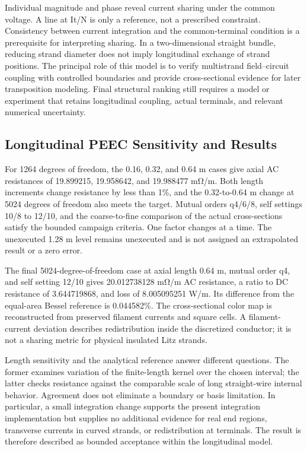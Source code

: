 \documentclass[11pt]{article}
\begin{document}
Individual magnitude and phase reveal current sharing under the common voltage. A line at It/N is only a reference, not a prescribed constraint. Consistency between current integration and the common-terminal condition is a prerequisite for interpreting sharing. In a two-dimensional straight bundle, reducing strand diameter does not imply longitudinal exchange of strand positions. The principal role of this model is to verify multistrand field–circuit coupling with controlled boundaries and provide cross-sectional evidence for later transposition modeling. Final structural ranking still requires a model or experiment that retains longitudinal coupling, actual terminals, and relevant numerical uncertainty.


\subsection*{Longitudinal PEEC Sensitivity and Results}
\hypertarget{03.peec_results.heading}{}
For 1264 degrees of freedom, the 0.16, 0.32, and 0.64 m cases give axial AC resistances of 19.899215, 19.958642, and 19.988477 mΩ/m. Both length increments change resistance by less than 1\%, and the 0.32-to-0.64 m change at 5024 degrees of freedom also meets the target. Mutual orders q4/6/8, self settings 10/8 to 12/10, and the coarse-to-fine comparison of the actual cross-sections satisfy the bounded campaign criteria. One factor changes at a time. The unexecuted 1.28 m level remains unexecuted and is not assigned an extrapolated result or a zero error.


The final 5024-degree-of-freedom case at axial length 0.64 m, mutual order q4, and self setting 12/10 gives 20.012738128 mΩ/m AC resistance, a ratio to DC resistance of 3.644719868, and loss of 8.005095251 W/m. Its difference from the equal-area Bessel reference is 0.044582\%. The cross-sectional color map is reconstructed from preserved filament currents and square cells. A filament-current deviation describes redistribution inside the discretized conductor; it is not a sharing metric for physical insulated Litz strands.


Length sensitivity and the analytical reference answer different questions. The former examines variation of the finite-length kernel over the chosen interval; the latter checks resistance against the comparable scale of long straight-wire internal behavior. Agreement does not eliminate a boundary or basis limitation. In particular, a small integration change supports the present integration implementation but supplies no additional evidence for real end regions, transverse currents in curved strands, or redistribution at terminals. The result is therefore described as bounded acceptance within the longitudinal model.
\end{document}
